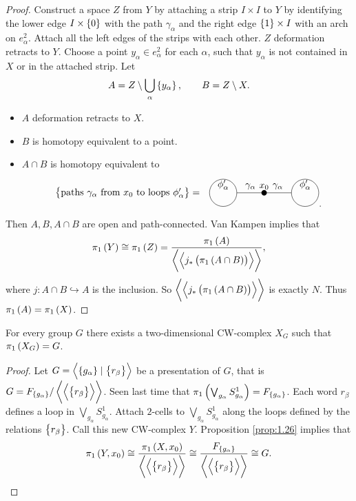 \begin{proof}
Construct a space $ Z $ from $ Y $ by attaching a strip $ I \times I $ to $ Y $ by identifying the lower edge $ I \times \cbr{0} $ with the path $ \gamma_\alpha $ and the right edge $ \cbr{1} \times I $ with an arch on $ e_\alpha^2 $. Attach all the left edges of the strips with each other. $ Z $ deformation retracts to $ Y $. Choose a point $ y_\alpha \in e_\alpha^2 $ for each $ \alpha $, such that $ y_\alpha $ is not contained in $ X $ or in the attached strip. Let
$$ A = Z \setminus \bigcup_\alpha \cbr{y_\alpha}, \qquad B = Z \setminus X. $$
\begin{itemize}
\item $ A $ deformation retracts to $ X $.
\item $ B $ is homotopy equivalent to a point.
\item $ A \cap B $ is homotopy equivalent to
$$
\begin{tikzpicture}
\draw (-5, 0) node{$ \cbr{\text{paths} \ \gamma_\alpha \ \text{from} \ x_0 \ \text{to loops} \ \phi_\alpha'} = $};
\fill (0, 0) circle (0.1) node[above]{$ x_0 $};
\draw (0, 0) to node[above]{$ \gamma_\alpha $} (-1, 0);
\draw (0, 0) to node[above]{$ \gamma_\alpha $} (1, 0);
\draw (-1.5, 0) circle (0.5) node[above]{$ \phi_\alpha' $};
\draw (1.5, 0) circle (0.5) node[above]{$ \phi_\alpha' $};
\end{tikzpicture}.
$$
\end{itemize}
Then $ A, B, A \cap B $ are open and path-connected. Van Kampen implies that
$$ \pi_1\br{Y} \cong \pi_1\br{Z} = \dfrac{\pi_1\br{A}}{\abr{\abr{j_*\br{\pi_1\br{A \cap B}}}}}, $$
where $ j : A \cap B \hookrightarrow A $ is the inclusion. So $ \abr{\abr{j_*\br{\pi_1\br{A \cap B}}}} $ is exactly $ N $. Thus $ \pi_1\br{A} = \pi_1\br{X} $.
\end{proof}


\begin{corollary}
For every group $ G $ there exists a two-dimensional CW-complex $ X_G $ such that $ \pi_1\br{X_G} = G $.
\end{corollary}

\begin{proof}
Let $ G = \abr{\cbr{g_\alpha} \mid \cbr{r_\beta}} $ be a presentation of $ G $, that is $ G = F_{\cbr{g_\alpha}} / \abr{\abr{\cbr{r_\beta}}} $. Seen last time that $ \pi_1\br{\bigvee_{g_\alpha} S_{g_\alpha}^1} = F_{\cbr{g_\alpha}} $. Each word $ r_\beta $ defines a loop in $ \bigvee_{g_\alpha} S_{g_\alpha}^1 $. Attach $ 2 $-cells to $ \bigvee_{g_\alpha} S_{g_\alpha}^1 $ along the loops defined by the relations $ \cbr{r_\beta} $. Call this new CW-complex $ Y $. Proposition \ref{prop:1.26} implies that
$$ \pi_1\br{Y, x_0} \cong \dfrac{\pi_1\br{X, x_0}}{\abr{\abr{\cbr{r_\beta}}}} \cong \dfrac{F_{\cbr{g_\alpha}}}{\abr{\abr{\cbr{r_\beta}}}} \cong G. $$
\end{proof}

